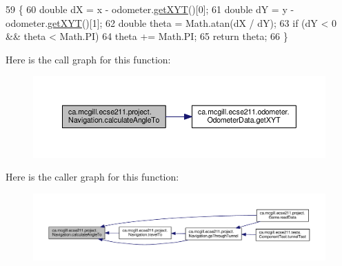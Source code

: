 \begin{DoxyCode}
59                                                      \{
60     \textcolor{keywordtype}{double} dX = x - odometer.\hyperlink{classca_1_1mcgill_1_1ecse211_1_1odometer_1_1_odometer_data_a8f40f0264c68f0cbed4fff1723ae7863}{getXYT}()[0];
61     \textcolor{keywordtype}{double} dY = y - odometer.\hyperlink{classca_1_1mcgill_1_1ecse211_1_1odometer_1_1_odometer_data_a8f40f0264c68f0cbed4fff1723ae7863}{getXYT}()[1];
62     \textcolor{keywordtype}{double} theta = Math.atan(dX / dY);
63     \textcolor{keywordflow}{if} (dY < 0 && theta < Math.PI)
64       theta += Math.PI;
65     \textcolor{keywordflow}{return} theta;
66   \}
\end{DoxyCode}
Here is the call graph for this function\+:
\nopagebreak
\begin{figure}[H]
\begin{center}
\leavevmode
\includegraphics[width=350pt]{classca_1_1mcgill_1_1ecse211_1_1project_1_1_navigation_a4376e54162df8f123ca3b52e4fd2f38d_cgraph}
\end{center}
\end{figure}
Here is the caller graph for this function\+:
\nopagebreak
\begin{figure}[H]
\begin{center}
\leavevmode
\includegraphics[width=350pt]{classca_1_1mcgill_1_1ecse211_1_1project_1_1_navigation_a4376e54162df8f123ca3b52e4fd2f38d_icgraph}
\end{center}
\end{figure}
\mbox{\label{classca_1_1mcgill_1_1ecse211_1_1project_1_1_navigation_ac9e260bcd619ffa4820d7d0de7ea1c12}} 
